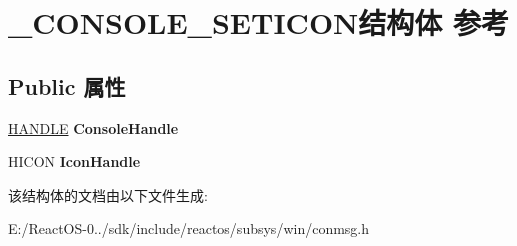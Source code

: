 \hypertarget{struct___c_o_n_s_o_l_e___s_e_t_i_c_o_n}{}\section{\+\_\+\+C\+O\+N\+S\+O\+L\+E\+\_\+\+S\+E\+T\+I\+C\+O\+N结构体 参考}
\label{struct___c_o_n_s_o_l_e___s_e_t_i_c_o_n}
\subsection*{Public 属性}
\begin{DoxyCompactItemize}
\item 
\mbox{\label{struct___c_o_n_s_o_l_e___s_e_t_i_c_o_n_a93a0b0957ce42b94bd40efcdb23511c7}} 
\hyperlink{interfacevoid}{H\+A\+N\+D\+LE} {\bfseries Console\+Handle}
\item 
\mbox{\label{struct___c_o_n_s_o_l_e___s_e_t_i_c_o_n_affc4af88969f24b0316c0dfda14dbe70}} 
H\+I\+C\+ON {\bfseries Icon\+Handle}
\end{DoxyCompactItemize}


该结构体的文档由以下文件生成\+:\begin{DoxyCompactItemize}
\item 
E\+:/\+React\+O\+S-\/0../sdk/include/reactos/subsys/win/conmsg.\+h\end{DoxyCompactItemize}

